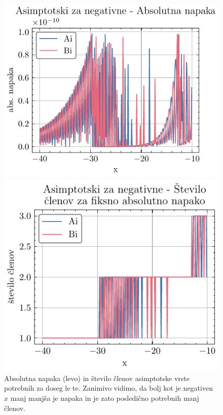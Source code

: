\documentclass[slovene,11pt,a4paper]{article}
\begin{document}
\begin{figure}[h]
  \centering
  \begin{minipage}{0.48\textwidth}
    \centering
    \includegraphics[width=\linewidth]{graphs/neg_abs_err.pdf}
  \end{minipage}\hfill
  \begin{minipage}{0.48\textwidth}
    \centering
    \includegraphics[width=\linewidth]{graphs/neg_abs_err_n.pdf}
  \end{minipage}
  \caption{Absolutna napaka (levo) in število členov asimptotske vrste potrebnih za doseg le te. Zanimivo vidimo, da bolj kot je negativen $x$ manj manjša je napaka in je zato posledično potrebnih manj členov.}
  \label{fig: neg_abs}
\end{figure}
\end{document}
